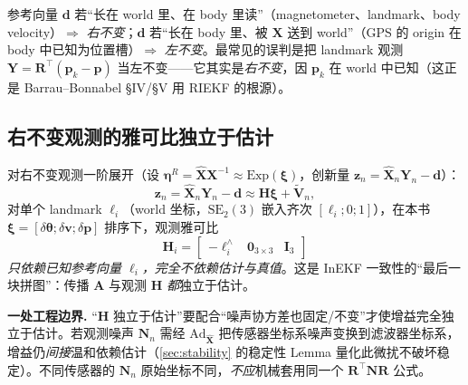 \begin{insight}[记忆法则]
参考向量 $\mathbf{d}$ 若“长在 world 里、在 body 里读”（magnetometer、landmark、body velocity）$\Rightarrow$ \emph{右不变}；$\mathbf{d}$ 若“长在 body 里、被 $\mathbf{X}$ 送到 world”（GPS 的 origin 在 body 中已知为位置槽）$\Rightarrow$ \emph{左不变}。最常见的误判是把 landmark 观测 $\mathbf{Y}=\mathbf{R}^\top(\mathbf{p}_k-\mathbf{p})$ 当左不变——它其实是\emph{右不变}，因 $\mathbf{p}_k$ 在 world 中已知（这正是 Barrau--Bonnabel §IV/§V 用 RIEKF 的根源）。
\end{insight}

\subsection{右不变观测的雅可比独立于估计}
\label{subsec:H-independent}

对右不变观测一阶展开（设 $\boldsymbol{\eta}^R=\hat{\mathbf{X}}\mathbf{X}^{-1}\approx\mathrm{Exp}(\boldsymbol{\xi})$，创新量 $\mathbf{z}_n=\hat{\mathbf{X}}_n\mathbf{Y}_n-\mathbf{d}$）：
\begin{equation}
  \mathbf{z}_n=\hat{\mathbf{X}}_n\mathbf{Y}_n-\mathbf{d}\approx\mathbf{H}\boldsymbol{\xi}+\tilde{\mathbf{V}}_n,
  \label{eq:inekf-innov}
\end{equation}
对单个 landmark $\boldsymbol{\ell}_i$（world 坐标，$\mathrm{SE}_2(3)$ 嵌入齐次 $[\boldsymbol{\ell}_i;0;1]$），在本书 $\boldsymbol{\xi}=[\delta\boldsymbol{\theta};\delta\mathbf{v};\delta\mathbf{p}]$ 排序下，观测雅可比
\begin{equation}
  \mathbf{H}_i=\begin{bmatrix}-\boldsymbol{\ell}_i^\wedge&\mathbf{0}_{3\times3}&\mathbf{I}_3\end{bmatrix}
  \label{eq:inekf-H}
\end{equation}
\emph{只依赖已知参考向量 $\boldsymbol{\ell}_i$，完全不依赖估计与真值}\cite{barrau2017invariant}。这是 InEKF 一致性的“最后一块拼图”：传播 $\mathbf{A}$ 与观测 $\mathbf{H}$ \emph{都}独立于估计。

\begin{note}
\textbf{一处工程边界.}\;
“$\mathbf{H}$ 独立于估计”要配合“噪声协方差也固定/不变”才使增益完全独立于估计。若观测噪声 $\mathbf{N}_n$ 需经 $\mathrm{Ad}_{\hat{\mathbf{X}}}$ 把传感器坐标系噪声变换到滤波器坐标系，增益仍\emph{间接}温和依赖估计（\cref{sec:stability} 的稳定性 Lemma 量化此微扰不破坏稳定）。不同传感器的 $\mathbf{N}_n$ 原始坐标不同，\emph{不应}机械套用同一个 $\mathbf{R}^\top\mathbf{N}\mathbf{R}$ 公式。
\end{note}

